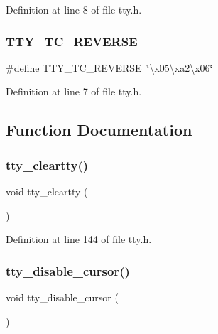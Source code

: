 Definition at line 8 of file tty.\+h.

\mbox{\label{a00035_a3444f7a6be040f896a3e9fd54492ea30_a3444f7a6be040f896a3e9fd54492ea30}} 
\subsubsection{\texorpdfstring{T\+T\+Y\+\_\+\+T\+C\+\_\+\+R\+E\+V\+E\+R\+SE}{TTY\_TC\_REVERSE}}
{\footnotesize\ttfamily \#define T\+T\+Y\+\_\+\+T\+C\+\_\+\+R\+E\+V\+E\+R\+SE~\char`\"{}\textbackslash{}x05\textbackslash{}xa2\textbackslash{}x06\char`\"{}}



Definition at line 7 of file tty.\+h.



\subsection{Function Documentation}
\mbox{\label{a00035_a5d3d15fdf823500b88f9a02c8e8c7682_a5d3d15fdf823500b88f9a02c8e8c7682}} 
\subsubsection{\texorpdfstring{tty\+\_\+cleartty()}{tty\_cleartty()}}
{\footnotesize\ttfamily void tty\+\_\+cleartty (\begin{DoxyParamCaption}{ }\end{DoxyParamCaption})}



Definition at line 144 of file tty.\+h.

\mbox{\label{a00035_a78c20225f9289b7e20cce21257ce8dca_a78c20225f9289b7e20cce21257ce8dca}} 
\subsubsection{\texorpdfstring{tty\+\_\+disable\+\_\+cursor()}{tty\_disable\_cursor()}}
{\footnotesize\ttfamily void tty\+\_\+disable\+\_\+cursor (\begin{DoxyParamCaption}{ }\end{DoxyParamCaption})}



